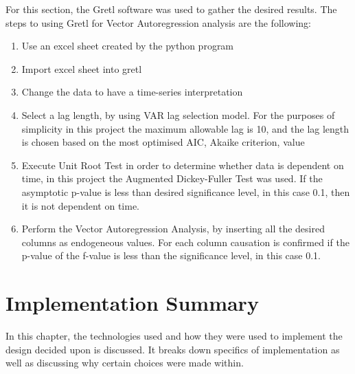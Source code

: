 For this section, the Gretl software was used to gather the desired results. The steps to using Gretl for Vector Autoregression analysis are the following:
\begin{enumerate}
    \item Use an excel sheet created by the python program
    \item Import excel sheet into gretl
    \item Change the data to have a time-series interpretation
    \item Select a lag length, by using VAR lag selection model. For the purposes of simplicity in this project the maximum allowable lag is 10, and the lag length is chosen based on the most optimised AIC, Akaike criterion, value
    \item Execute Unit Root Test in order to determine whether data is dependent on time, in this project the Augmented Dickey-Fuller Test was used. If the asymptotic p-value is less than desired significance level, in this case 0.1, then it is not dependent on time.
    \item Perform the Vector Autoregression Analysis, by inserting all the desired columns as endogeneous values. For each column causation is confirmed if the p-value of the f-value is less than the significance level, in this case 0.1.
\end{enumerate}

\section{Implementation Summary}

In this chapter, the technologies used and how they were used to implement the design decided upon is discussed. It breaks down specifics of implementation as well as discussing why certain choices were made within.